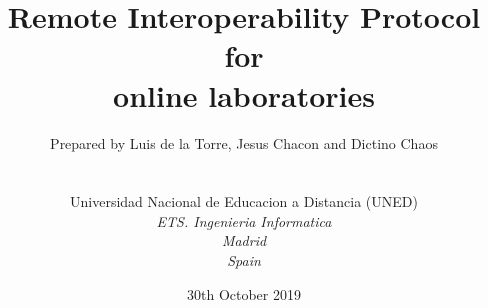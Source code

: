 
\def\Company{Universidad Nacional de Educacion a Distancia (UNED)}
\def\Institute{\textit{ETS. Ingenieria Informatica}}
\def\City{\textit{Madrid}}
\def\Country{\textit{Spain}}

\def\BoldTitle{Remote Interoperability Protocol}

\def\Subtitle{for \\ online laboratories \\}
\def\Authors{Prepared by Luis de la Torre, Jesus Chacon and Dictino Chaos } 
\def\Shortname{L. de la Torre, J. Chacon, D. Chaos}


\title{\textbf{\BoldTitle}\\\Subtitle}
\author{\Authors \\ \\ \\ \Company \\ \Institute\\ \City\\ \Country}
\date{30th October 2019}

